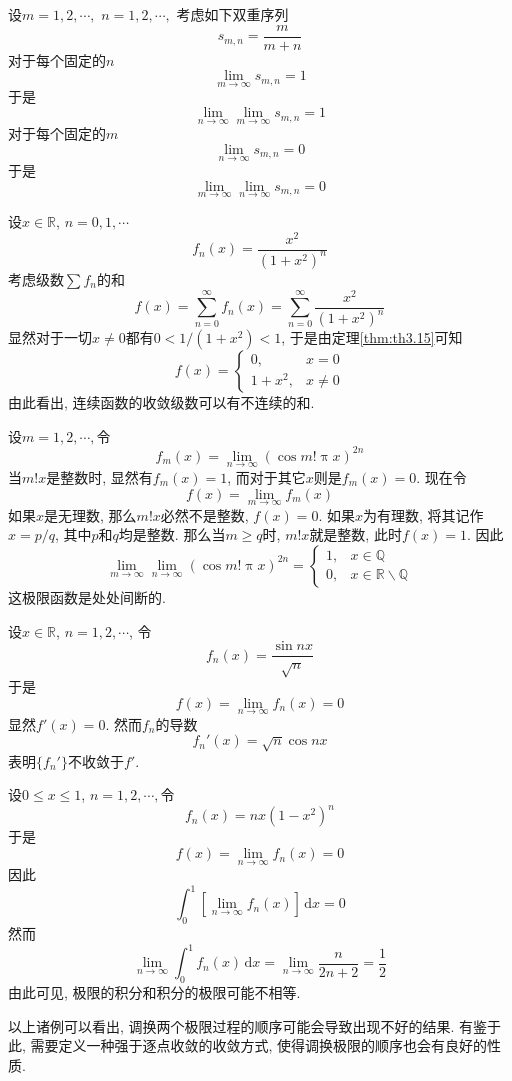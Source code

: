 \documentclass[cn,12pt,math=mtpro2,citestyle=gb7714-2015,bibstyle=gb7714-2015,twocol]{elegantbook}
\newcommand{\R}{\mathbb{R}}
\newcommand{\Q}{\mathbb{Q}}
\newcommand{\dx}{\,\text{d}x}
\newcommand{\limn }{\lim_{n\to\infty}}
\begin{document}
\begin{example}
设$m=1,2,\cdots,$ $n=1,2,\cdots,$ 考虑如下双重序列
$$s_{m,n}=\frac{m}{m+n}$$
对于每个固定的$n$
$$\lim_{m\to\infty} s_{m,n}=1$$
于是
$$\limn \lim_{m\to\infty} s_{m,n}=1$$
对于每个固定的$m$
$$\limn  s_{m,n}=0$$
于是
$$\lim_{m\to\infty}\limn  s_{m,n}=0$$
\end{example}
\begin{example}
设$x\in \R$, $n=0,1,\cdots$
$$f_n(x)=\frac{x^2}{(1+x^2)^n}$$
考虑级数$\sum f_n$的和
$$f(x)=\sum_{n=0}^{\infty}f_n(x)=\sum_{n=0}^{\infty}\frac{x^2}{(1+x^2)^n}$$
显然对于一切$x\neq0$都有$0<1/(1+x^2)<1$, 于是由定理\ref{thm:th3.15}可知
$$f(x)=\begin{cases}
0, & x=0 \\
1+x^2, & x\neq0 \end{cases}$$
由此看出, 连续函数的收敛级数可以有不连续的和.
\end{example}
\begin{example}
设$m=1,2,\cdots,$令
$$f_m(x)=\limn (\cos m!\uppi x)^{2n}$$
当$m!x$是整数时, 显然有$f_m(x)=1$, 而对于其它$x$则是$f_m(x)=0$. 现在令
$$f(x)=\lim_{m\to\infty}f_m(x)$$
如果$x$是无理数, 那么$m!x$必然不是整数, $f(x)=0$. 如果$x$为有理数, 将其记作$x=p/q$, 其中$p$和$q$均是整数. 那么当$m\geq q$时, $m!x$就是整数, 此时$f(x)=1$. 因此
$$\lim_{m\to\infty}\limn (\cos m!\uppi x)^{2n}=\begin{cases}
1, & x\in\Q \\
0, & x\in\R\backslash\Q \end{cases}$$
这极限函数是处处间断的.
\end{example}
\begin{example}\label{ex3}
设$x\in\R$, $n=1,2,\cdots$, 令
$$f_n(x)=\frac{\sin nx}{\sqrt{n}}$$
于是
$$f(x)=\limn f_n(x)=0$$
显然$f'(x)=0$. 然而$f_n$的导数
$$f_n'(x)=\sqrt{n}\cos nx$$
表明$\{f_n'\}$不收敛于$f'$.
\end{example}
\begin{example}
设$0\leq x\leq1$, $n=1,2,\cdots,$令
$$f_n(x)=nx(1-x^2)^n$$
于是
$$f(x)=\limn f_n(x)=0$$
因此
$$\int_{0}^{1}\left[\limn f_n(x)\right]\dx=0$$
然而
$$\limn \int_{0}^{1}f_n(x)\dx=\limn \frac{n}{2n+2}=\frac{1}{2}$$
由此可见, 极限的积分和积分的极限可能不相等.
\end{example}
以上诸例可以看出, 调换两个极限过程的顺序可能会导致出现不好的结果. 有鉴于此, 需要定义一种强于逐点收敛的收敛方式, 使得调换极限的顺序也会有良好的性质.
\end{document}

